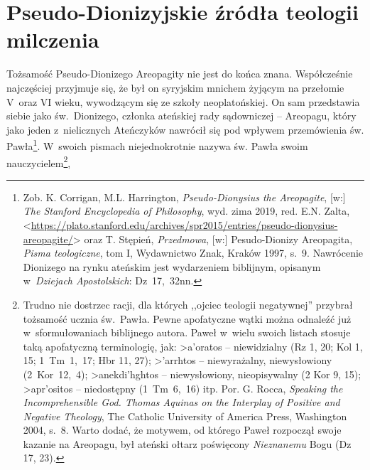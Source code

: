 \section{Pseudo-Dionizyjskie źródła teologii milczenia}\label{sil-dionizy}

Tożsamość Pseudo-Dionizego Areopagity nie jest do końca znana. Współcześnie najczęściej przyjmuje się, że był on syryjskim mnichem żyjącym na przełomie V~oraz VI wieku, wywodzącym się ze szkoły neoplatońskiej. On sam przedstawia siebie jako św.~Dionizego, członka ateńskiej rady sądowniczej -- Areopagu, który jako jeden z~nielicznych Ateńczyków nawrócił się pod wpływem przemówienia św. Pawła\footnote{Zob. K. Corrigan, M.L. Harrington, \textit{Pseudo-Dionysius the Areopagite}, [w:] \textit{The Stanford Encyclopedia of Philosophy}, wyd. zima 2019, red. E.N. Zalta, {\textless}\url{https://plato.stanford.edu/archives/spr2015/entries/pseudo-dionysius-areopagite/}{\textgreater} oraz T. Stępień, \textit{Przedmowa}, [w:] Pesudo-Dionizy Areopagita, \textit{Pisma teologiczne}, tom I, Wydawnictwo Znak, Kraków 1997, s.~9. Nawrócenie Dionizego na rynku ateńskim jest wydarzeniem biblijnym, opisanym w~\textit{Dziejach Apostolskich}: Dz~17,~32nn.}. W~swoich pismach niejednokrotnie nazywa św. Pawła swoim nauczycielem\footnote{Trudno nie dostrzec racji, dla których ,,ojciec teologii negatywnej'' przybrał tożsamość ucznia św.~Pawła. Pewne apofatyczne wątki można odnaleźć już w~sformułowaniach biblijnego autora. Paweł w~wielu swoich listach stosuje taką apofatyczną terminologię, jak:
\textgreek{>a'oratos}
-- niewidzialny (Rz 1, 20; Kol 1, 15; 1~Tm~1,~17; Hbr 11, 27);
\textgreek{>'arrhtos}
-- niewyrażalny, niewysłowiony (2~Kor~12,~4);
\textgreek{>anekdi'hghtos}
-- niewysłowiony, nieopisywalny (2 Kor 9, 15);
\textgreek{>apr'ositos}
-- niedostępny (1~Tm~6,~16) itp. Por. G. Rocca, \textit{Speaking the Incomprehensible God. Thomas Aquinas on the Interplay of Positive and Negative Theology}, The Catholic University of America Press, Washington 2004, s.~8. Warto dodać, że motywem, od którego Paweł rozpoczął swoje kazanie na Areopagu, był ateński ołtarz poświęcony \textit{Nieznanemu} Bogu (Dz 17, 23).},
